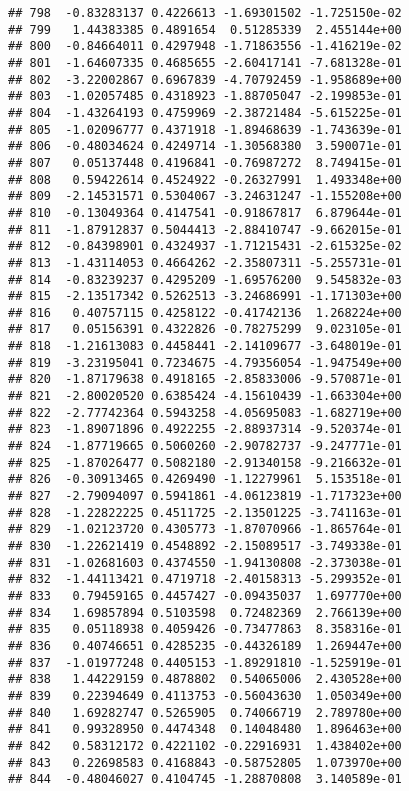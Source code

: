 \documentclass[
]{article}
\begin{document}
\begin{verbatim}
## 798  -0.83283137 0.4226613 -1.69301502 -1.725150e-02
## 799   1.44383385 0.4891654  0.51285339  2.455144e+00
## 800  -0.84664011 0.4297948 -1.71863556 -1.416219e-02
## 801  -1.64607335 0.4685655 -2.60417141 -7.681328e-01
## 802  -3.22002867 0.6967839 -4.70792459 -1.958689e+00
## 803  -1.02057485 0.4318923 -1.88705047 -2.199853e-01
## 804  -1.43264193 0.4759969 -2.38721484 -5.615225e-01
## 805  -1.02096777 0.4371918 -1.89468639 -1.743639e-01
## 806  -0.48034624 0.4249714 -1.30568380  3.590071e-01
## 807   0.05137448 0.4196841 -0.76987272  8.749415e-01
## 808   0.59422614 0.4524922 -0.26327991  1.493348e+00
## 809  -2.14531571 0.5304067 -3.24631247 -1.155208e+00
## 810  -0.13049364 0.4147541 -0.91867817  6.879644e-01
## 811  -1.87912837 0.5044413 -2.88410747 -9.662015e-01
## 812  -0.84398901 0.4324937 -1.71215431 -2.615325e-02
## 813  -1.43114053 0.4664262 -2.35807311 -5.255731e-01
## 814  -0.83239237 0.4295209 -1.69576200  9.545832e-03
## 815  -2.13517342 0.5262513 -3.24686991 -1.171303e+00
## 816   0.40757115 0.4258122 -0.41742136  1.268224e+00
## 817   0.05156391 0.4322826 -0.78275299  9.023105e-01
## 818  -1.21613083 0.4458441 -2.14109677 -3.648019e-01
## 819  -3.23195041 0.7234675 -4.79356054 -1.947549e+00
## 820  -1.87179638 0.4918165 -2.85833006 -9.570871e-01
## 821  -2.80020520 0.6385424 -4.15610439 -1.663304e+00
## 822  -2.77742364 0.5943258 -4.05695083 -1.682719e+00
## 823  -1.89071896 0.4922255 -2.88937314 -9.520374e-01
## 824  -1.87719665 0.5060260 -2.90782737 -9.247771e-01
## 825  -1.87026477 0.5082180 -2.91340158 -9.216632e-01
## 826  -0.30913465 0.4269490 -1.12279961  5.153518e-01
## 827  -2.79094097 0.5941861 -4.06123819 -1.717323e+00
## 828  -1.22822225 0.4511725 -2.13501225 -3.741163e-01
## 829  -1.02123720 0.4305773 -1.87070966 -1.865764e-01
## 830  -1.22621419 0.4548892 -2.15089517 -3.749338e-01
## 831  -1.02681603 0.4374550 -1.94130808 -2.373038e-01
## 832  -1.44113421 0.4719718 -2.40158313 -5.299352e-01
## 833   0.79459165 0.4457427 -0.09435037  1.697770e+00
## 834   1.69857894 0.5103598  0.72482369  2.766139e+00
## 835   0.05118938 0.4059426 -0.73477863  8.358316e-01
## 836   0.40746651 0.4285235 -0.44326189  1.269447e+00
## 837  -1.01977248 0.4405153 -1.89291810 -1.525919e-01
## 838   1.44229159 0.4878802  0.54065006  2.430528e+00
## 839   0.22394649 0.4113753 -0.56043630  1.050349e+00
## 840   1.69282747 0.5265905  0.74066719  2.789780e+00
## 841   0.99328950 0.4474348  0.14048480  1.896463e+00
## 842   0.58312172 0.4221102 -0.22916931  1.438402e+00
## 843   0.22698583 0.4168843 -0.58752805  1.073970e+00
## 844  -0.48046027 0.4104745 -1.28870808  3.140589e-01

\end{verbatim}
\end{document}
